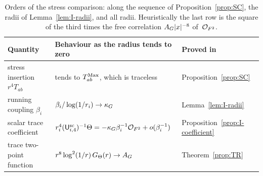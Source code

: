 \begin{table}[ht]
\centering\small
\begin{tabular}{@{}lll@{}}
\toprule
Quantity & Behaviour as the radius tends to zero & Proved in\\
\midrule
stress insertion $r^4T_{ab}$ & tends to $T^{\mathrm{Max}}_{ab}$, which is traceless & Proposition~\ref{prop:SC}\\
running coupling $\beta_i$ & $\beta_i/\log(1/r_i)\to\kappa_G$ & Lemma~\ref{lem:I-radii}\\
scalar trace coefficient & $r_i^4(\mathsf{U}_{i,4}^{\mathrm{sc}})^{-1}\Theta=-\kappa_G\beta_i^{-1}\mathcal{O}_{F^2}+o(\beta_i^{-1})$ & Proposition~\ref{prop:I-coefficient}\\
trace two-point function & $r^8\log^2(1/r)\,G_{\Theta}(r)\to A_G$ & Theorem~\ref{prop:TR}\\
\bottomrule
\end{tabular}
\caption{Orders of the stress comparison: along the sequence of Proposition~\ref{prop:SC}, the radii of Lemma~\ref{lem:I-radii}, and all radii. Heuristically the last row is the square of the third times the free correlation $A_G|x|^{-8}$ of~$\mathcal{O}_{F^2}$.}\label{tab:I-orders}
\end{table}

